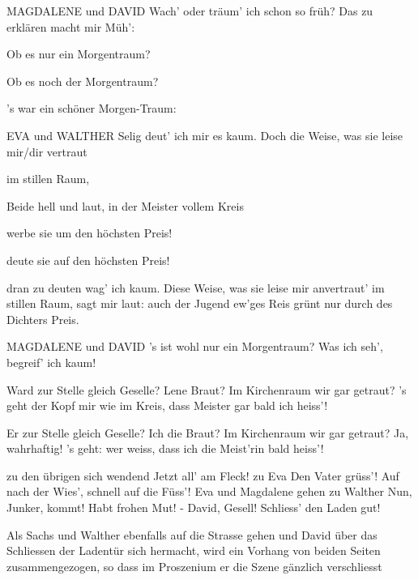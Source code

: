 \begin{drama}
MAGDALENE und DAVID
Wach' oder träum' ich schon so früh?
Das zu erklären macht mir Müh':

\Evaspeaks
Ob es nur ein Morgentraum?

\Waltherspeaks
Ob es noch der Morgentraum?

\Sachsspeaks
's war ein schöner Morgen-Traum:

EVA und WALTHER
Selig deut' ich mir es kaum.
Doch die Weise, was sie leise
mir/dir vertraut

\Waltherspeaks
im stillen Raum,

Beide
hell und laut,
in der Meister vollem Kreis

\Waltherspeaks
werbe sie um den höchsten Preis!

\Evaspeaks
deute sie auf den höchsten Preis!

\Sachsspeaks
dran zu deuten wag' ich kaum.
Diese Weise, was sie leise
mir anvertraut' im stillen Raum,
sagt mir laut:
auch der Jugend ew'ges Reis
grünt nur durch des Dichters Preis.

MAGDALENE und DAVID
's ist wohl nur ein Morgentraum?
Was ich seh', begreif' ich kaum!

\Davidspeaks
Ward zur Stelle gleich Geselle?
Lene Braut?
Im Kirchenraum wir gar getraut?
's geht der Kopf mir wie im Kreis,
dass Meister gar bald ich heiss'!

\Magdalenespeaks
Er zur Stelle gleich Geselle?
Ich die Braut?
Im Kirchenraum wir gar getraut?
Ja, wahrhaftig! 's geht:
wer weiss,
dass ich die Meist'rin bald heiss'!

\Sachsspeaks
zu den übrigen sich wendend
Jetzt all' am Fleck!
zu Eva
Den Vater grüss'!
Auf nach der Wies', schnell auf die Füss'!
Eva und Magdalene gehen
zu Walther
Nun, Junker, kommt! Habt frohen Mut! -
David, Gesell! Schliess' den Laden gut!

Als Sachs und Walther ebenfalls auf die Strasse gehen und David über das Schliessen der Ladentür sich hermacht, wird ein Vorhang von beiden Seiten zusammengezogen, so dass im Proszenium er die Szene gänzlich verschliesst


\scene


\end{drama}
